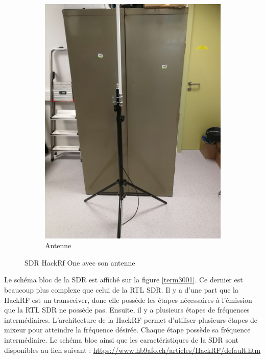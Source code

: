 \begin{figure}[h]
\hspace{0.5cm} %
\begin{subfigure}{0.4\textwidth}
  \centering
  \includegraphics[width=\textwidth]{images/pied.png}
  \caption{Antenne}
  \label{term340}
\end{subfigure}
\caption{SDR HackRf One avec son antenne}
\label{bothimages}
\end{figure}


Le schéma bloc de la SDR est affiché sur la figure \ref{term3001}. Ce dernier est beaucoup plus complexe que celui de la RTL SDR. Il y a d'une part que la HackRF est un transceiver, donc elle possède les étapes nécessaires à l'émission que la RTL SDR ne possède pas. Ensuite, il y a plusieurs étapes de fréquences intermédiaires. L'architecture de la HackRF permet d'utiliser plusieurs étapes de mixeur pour atteindre la fréquence désirée. Chaque étape possède sa fréquence intermédiaire. Le schéma bloc ainsi que les caractéristiques de la SDR sont disponibles au lien suivant : \href{https://www.hb9afo.ch/articles/HackRF/default.htm}{https://www.hb9afo.ch/articles/HackRF/default.htm}

